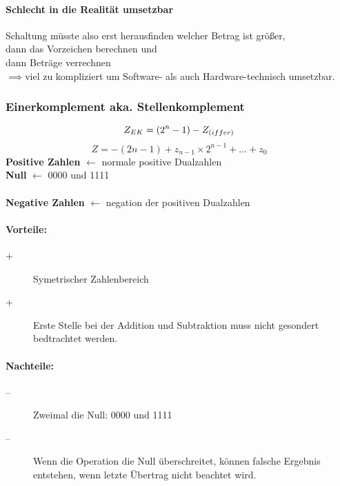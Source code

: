 \documentclass[a4paper]{scrartcl}
\begin{document}
					\paragraph{Schlecht in die Realität umsetzbar}
					Schaltung müsste also erst herausfinden welcher Betrag ist größer, \\
					dann das Vorzeichen berechnen und \\
					dann Beträge verrechnen\\
					\( \implies \)viel zu kompliziert um Software- als auch Hardware-technisch umsetzbar.\\
					
				\subsubsection{Einerkomplement aka. Stellenkomplement}
					\[
					Z_{EK} = (2^n -1) - Z_{(iffer)}\\
					\]
					\[
					Z = -(2n -1) + z_{n-1} \times 2^{n-1} + \dots +z_0
					\]
					\textbf{Positive Zahlen} \( \gets \) normale positive Dualzahlen  \\
					
					\textbf{Null} \( \gets \) 0000 und 1111\\
					\\
					\textbf{Negative Zahlen} \( \gets \) negation der positiven Dualzahlen  \\
					
					
					\paragraph{Vorteile:}
						\begin{description}
							\item[+] Symetrischer Zahlenbereich
							\item[+] Erste Stelle bei der Addition und Subtraktion muss nicht gesondert bedtrachtet werden.
						\end{description}
					
					\paragraph{Nachteile:}
						\begin{description}
							\item[--] 
								Zweimal die Null: 0000 und 1111
							\item[--]
								 Wenn die Operation die Null überschreitet, können falsche Ergebnis entstehen, wenn letzte Übertrag nicht beachtet wird.
						\end{description}
					
\end{document}
